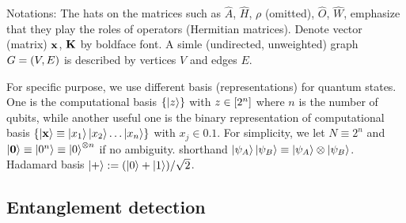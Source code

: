 \documentclass[
10pt,
aps,
pra,
linenumbers,
floatfix,
]{revtex4-2}
\theoremstyle{plain}
\theoremstyle{definition}
\newcommand{\ew}{\hat{W}}
\newcommand{\ob}{\hat{O}}
\newcommand{\hamiltonian}{\hat{H}}
\newcommand{\dm}{\rho}
\begin{document}
Notations: 
The hats on the matrices such as $\hat{A}$, $\hamiltonian$, $\dm$ (omitted), $\ob$, $\ew$, emphasize that they play the roles of operators (Hermitian matrices).
Denote vector (matrix) $\vb{x}$, $\vb{K}$ by boldface font.
A simle (undirected, unweighted) graph $G=(V,E)$ is described by vertices $V$ and edges $E$.

For specific purpose, we use different basis (representations) for quantum states.
One is the computational basis $\qty{\ket{z}}$ with $z\in \qty[2^n]$ where $n$ is the number of qubits,
while another useful one is the binary representation of computational basis $\qty{\ket{\vb{x}}\equiv\ket{x_1}\ket{x_2}\dots\ket{x_n}}$ with $x_j\in \qty{0,1}$. 
For simplicity, we let $N \equiv 2^n$ and $\ket{\vb{0}}\equiv\ket{0^n} \equiv\ket{0}^{\otimes n}$ if no ambiguity.
shorthand $\ket{\psi_A}\ket{\psi_B}\equiv \ket{\psi_A}\otimes \ket{\psi_B}$.
Hadamard basis $\ket{+}: = (\ket{0}+\ket{1})/\sqrt{2} $.

\subsection{Entanglement detection}
\end{document}
